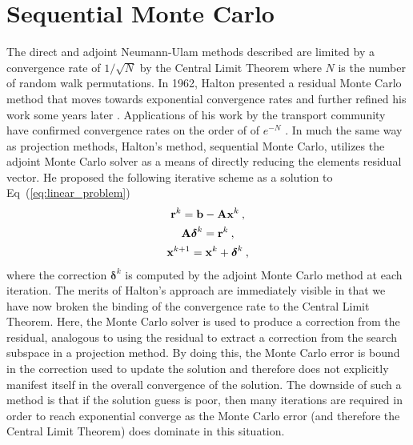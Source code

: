 \section{Sequential Monte Carlo}
\label{sec:sequential_mc}
The direct and adjoint Neumann-Ulam methods described are limited by a
convergence rate of $1/\sqrt{N}$ by the Central Limit Theorem where
$N$ is the number of random walk permutations. In 1962, Halton
presented a residual Monte Carlo method that moves towards exponential
convergence rates \citep{halton_sequential_1962} and further refined
his work some years later \citep{halton_sequential_1994}. Applications
of his work by the transport community have confirmed convergence
rates on the order of of $e^{-N}$ \citep{evans_residual_2003}. In
much the same way as projection methods, Halton's method, sequential
Monte Carlo, utilizes the adjoint Monte Carlo solver as a means of
directly reducing the elements residual vector. He proposed the
following iterative scheme as a solution to
Eq~(\ref{eq:linear_problem})\:
\begin{subequations}
  \begin{gather}
    \mathbf{r}^k = \mathbf{b} - \mathbf{A}\mathbf{x}^k\:,\\  
    \mathbf{A}\boldsymbol{\delta}^{k} = \mathbf{r}^{k}\:,\\
    \mathbf{x}^{k+1} = \mathbf{x}^k + \boldsymbol{\delta}^{k}\:,
  \end{gather}
  \label{eq:sequential_monte_carlo}
\end{subequations}
where the correction $\boldsymbol{\delta}^k$ is computed by the
adjoint Monte Carlo method at each iteration. The merits of Halton's
approach are immediately visible in that we have now broken the
binding of the convergence rate to the Central Limit Theorem. Here,
the Monte Carlo solver is used to produce a correction from the
residual, analogous to using the residual to extract a correction from
the search subspace in a projection method. By doing this, the Monte
Carlo error is bound in the correction used to update the solution and
therefore does not explicitly manifest itself in the overall
convergence of the solution. The downside of such a method is that if
the solution guess is poor, then many iterations are required in order
to reach exponential converge as the Monte Carlo error (and therefore
the Central Limit Theorem) does dominate in this situation.

